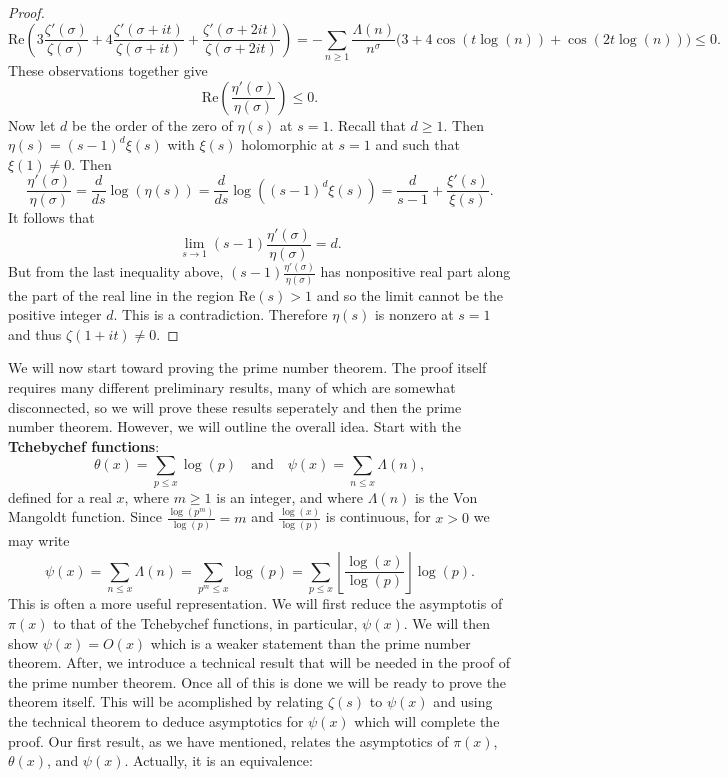 \documentclass[12pt]{book}
\theoremstyle{definition}\newframedtheorem{method}{Method}
\newcommand{\z}{\zeta}
\renewcommand{\t}{\theta}
\newcommand{\s}{\sigma}
\renewcommand{\L}{\Lambda}
\newcommand{\<}{\langle}
\renewcommand{\>}{\rangle}
\renewcommand{\Re}{\mathrm{Re}}
\begin{document}
\begin{proof}
        \[
          \Re\left(3\frac{\z'(\s)}{\z(\s)}+4\frac{\z'(\s+it)}{\z(\s+it)}+\frac{\z'(\s+2it)}{\z(\s+2it)}\right) = -\sum_{n \ge 1}\frac{\L(n)}{n^{\s}}\bigg(3+4\cos(t\log(n))+\cos(2t\log(n))\bigg) \le 0.
        \]
        These observations together give
        \[
          \Re\left(\frac{\eta'(\s)}{\eta(\s)}\right) \le 0.
        \]
        Now let $d$ be the order of the zero of $\eta(s)$ at $s = 1$. Recall that $d \ge 1$. Then $\eta(s) = (s-1)^{d}\xi(s)$ with $\xi(s)$ holomorphic at $s = 1$ and such that $\xi(1) \neq 0$. Then
        \[
          \frac{\eta'(\s)}{\eta(\s)} = \frac{d}{ds}\log(\eta(s)) = \frac{d}{ds}\log((s-1)^{d}\xi(s)) = \frac{d}{s-1}+\frac{\xi'(s)}{\xi(s)}.
        \]
        It follows that
        \[
          \lim_{s \to 1}(s-1)\frac{\eta'(\s)}{\eta(\s)} = d.
        \]
        But from the last inequality above, $(s-1)\frac{\eta'(\s)}{\eta(\s)}$ has nonpositive real part along the part of the real line in the region $\Re(s) > 1$ and so the limit cannot be the positive integer $d$. This is a contradiction. Therefore $\eta(s)$ is nonzero at $s = 1$ and thus $\z(1+it) \neq 0$.
      \end{proof}

      We will now start toward proving the prime number theorem. The proof itself requires many different preliminary results, many of which are somewhat disconnected, so we will prove these results seperately and then the prime number theorem. However, we will outline the overall idea. Start with the \textbf{Tchebychef functions}:
      \[
        \t(x) = \sum_{p \le x}\log(p) \quad \text{and} \quad \psi(x) = \sum_{n \le x}\L(n),
      \]
      defined for a real $x$, where $m \ge 1$ is an integer, and where $\L(n)$ is the Von Mangoldt function. Since $\frac{\log(p^{m})}{\log(p)} = m$ and $\frac{\log(x)}{\log(p)}$ is continuous, for $x > 0$ we may write
      \[
        \psi(x) = \sum_{n \le x}\L(n) = \sum_{p^{m} \le x}\log(p) = \sum_{p \le x}\left\lfloor\frac{\log(x)}{\log(p)}\right\rfloor\log(p).
      \]
      This is often a more useful representation. We will first reduce the asymptotis of $\pi(x)$ to that of the Tchebychef functions, in particular, $\psi(x)$. We will then show $\psi(x) = O(x)$ which is a weaker statement than the prime number theorem. After, we introduce a technical result that will be needed in the proof of the prime number theorem. Once all of this is done we will be ready to prove the theorem itself. This will be acomplished by relating $\z(s)$ to $\psi(x)$ and using the technical theorem to deduce asymptotics for $\psi(x)$ which will complete the proof. Our first result, as we have mentioned, relates the asymptotics of $\pi(x)$, $\t(x)$, and $\psi(x)$. Actually, it is an equivalence:
\end{document}

